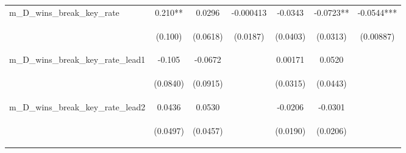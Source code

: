 \begin{tabular}{lcccccc}
m\_D\_wins\_break\_key\_rate & 0.210** & 0.0296 & -0.000413 & -0.0343 & -0.0723** & -0.0544*** \\
\vspace{4pt} & \begin{footnotesize}(0.100)\end{footnotesize} & \begin{footnotesize}(0.0618)\end{footnotesize} & \begin{footnotesize}(0.0187)\end{footnotesize} & \begin{footnotesize}(0.0403)\end{footnotesize} & \begin{footnotesize}(0.0313)\end{footnotesize} & \begin{footnotesize}(0.00887)\end{footnotesize} \\
m\_D\_wins\_break\_key\_rate\_lead1 & -0.105 & -0.0672 &  & 0.00171 & 0.0520 &  \\
\vspace{4pt} & \begin{footnotesize}(0.0840)\end{footnotesize} & \begin{footnotesize}(0.0915)\end{footnotesize} & \begin{footnotesize}\end{footnotesize} & \begin{footnotesize}(0.0315)\end{footnotesize} & \begin{footnotesize}(0.0443)\end{footnotesize} & \begin{footnotesize}\end{footnotesize} \\
m\_D\_wins\_break\_key\_rate\_lead2 & 0.0436 & 0.0530 &  & -0.0206 & -0.0301 &  \\
\vspace{4pt} & \begin{footnotesize}(0.0497)\end{footnotesize} & \begin{footnotesize}(0.0457)\end{footnotesize} & \begin{footnotesize}\end{footnotesize} & \begin{footnotesize}(0.0190)\end{footnotesize} & \begin{footnotesize}(0.0206)\end{footnotesize} & \begin{footnotesize}\end{footnotesize} \\

\end{tabular}
